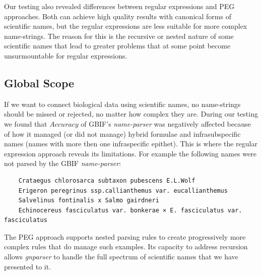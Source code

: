 \documentclass{bmcart}
\begin{document}
Our testing also revealed differences between regular expressions and PEG
approaches. Both can achieve high quality results with canonical forms of
scientific names, but the regular expressions are less suitable for more
complex name-strings. The reason for this is the recursive or nested nature of
some scientific names that lead to greater problems that at some point become
unsurmountable for regular expressions.

\subsection*{Global Scope}

If we want to connect biological data using scientific names, no name-strings
should be missed or rejected, no matter how complex they are. During our
testing we found that $Accuracy$ of GBIF's \textit{name-parser} was negatively
affected because of how it managed (or did not manage) hybrid formulae and
infrasubspecific names (names with more then one infraspecific epithet). This
is where the regular expression approach reveals its limitations. For example
the following names were not parsed by the GBIF \textit{name-parser}:

\vspace{0.5cm}

\begin{verbatim}
    Crataegus chlorosarca subtaxon pubescens E.L.Wolf
    Erigeron peregrinus ssp.callianthemus var. eucallianthemus
    Salvelinus fontinalis x Salmo gairdneri
    Echinocereus fasciculatus var. bonkerae × E. fasciculatus var. fasciculatus
\end{verbatim}

\vspace{0.5cm}

The PEG approach supports nested parsing rules to create progressively more
complex rules that do manage such examples. Its capacity to address recursion
allows \textit{gnparser} to handle the full spectrum of scientific names that
we have presented to it.
\end{document}
